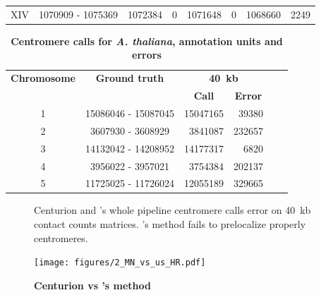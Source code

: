 \begin{table}[ht!]
\begin{center}
\begin{tabular}{c | c  r  r  r  r r r}
XIV & \num[group-separator={\,}]{1070909} - \num[group-separator={\,}]{1075369} & \num[group-separator={\,}]{1072384} & \small{\num[group-separator={\,}]{0}}  & \num[group-separator={\,}]{1071648} & \small{\num[group-separator={\,}]{0}}  & \num[group-separator={\,}]{1068660} & \small{\num[group-separator={\,}]{2249}}  \\
\end{tabular}
\end{center}
\label{supptable:schizonts_results}
\end{table}


\begin{table}[ht!]
\caption{\textbf{Centromere calls for \textit{A. thaliana},
annotation units and errors}}
\begin{center}
\begin{tabular}{c | c  r  r  r  r}
\textbf{Chromosome}  & \textbf{Ground truth} & \multicolumn{2}{c}{\textbf{40~kb}} \\
  &   &  \multicolumn{1}{c}{\textbf{Call}} &  \multicolumn{1}{c}{\textbf{Error}} \\
\hline
1 & \num[group-separator={\,}]{15086046} - \num[group-separator={\,}]{15087045} &
  \num[group-separator={\,}]{15047165} &
  \small{\num[group-separator={\,}]{39380}}  \\
2 & \num[group-separator={\,}]{3607930} - \num[group-separator={\,}]{3608929} &
    \num[group-separator={\,}]{3841087} &
\small{\num[group-separator={\,}]{232657}}   \\
3 & \num[group-separator={\,}]{14132042} - \num[group-separator={\,}]{14208952} &
  \num[group-separator={\,}]{14177317} &
  \small{\num[group-separator={\,}]{6820}} \\
4 & \num[group-separator={\,}]{3956022} - \num[group-separator={\,}]{3957021} &
  \num[group-separator={\,}]{3754384} &
  \small{\num[group-separator={\,}]{202137}}  \\
5 & \num[group-separator={\,}]{11725025} - \num[group-separator={\,}]{11726024} &
  \num[group-separator={\,}]{12055189} &
  \small{\num[group-separator={\,}]{329665}}  \\
\end{tabular}
\end{center}
\end{table}

\clearpage

\begin{figure}[ht!]
\caption{\textbf{Centurion vs \citet{marie-nelly:filling}'s method}}
Centurion and \citet{marie-nelly:filling}'s whole pipeline centromere calls
error on 40~kb contact counts matrices. \citet{marie-nelly:filling}'s method
fails to prelocalize properly centromeres.
\begin{center}
\texttt{[image: figures/2\_MN\_vs\_us\_HR.pdf]}
\end{center}
\label{suppfig:marie_nelly_vs_us_HR}
\end{figure}

